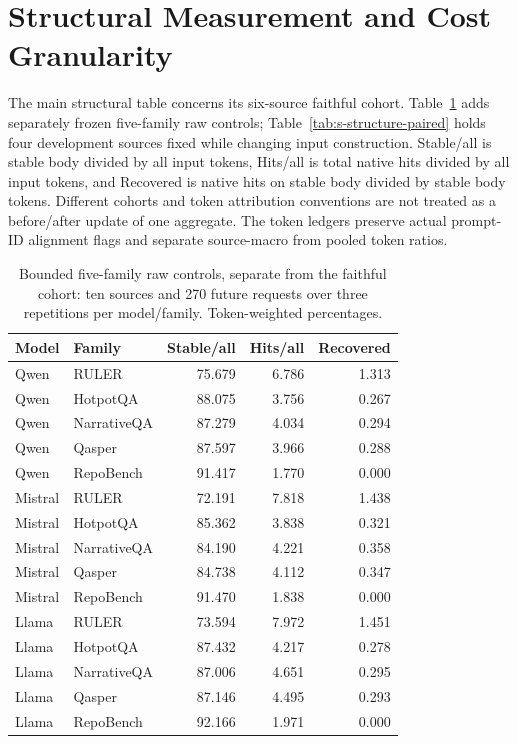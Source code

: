 \section{Structural Measurement and Cost Granularity}
\label{sec:s-closure}
The main structural table concerns its six-source faithful cohort. Table~\ref{tab:s-five-family-structure} adds separately frozen five-family raw controls; Table~\ref{tab:s-structure-paired} holds four development sources fixed while changing input construction. Stable/all is stable body divided by all input tokens, Hits/all is total native hits divided by all input tokens, and Recovered is native hits on stable body divided by stable body tokens. Different cohorts and token attribution conventions are not treated as a before/after update of one aggregate. The token ledgers preserve actual prompt-ID alignment flags and separate source-macro from pooled token ratios.

\begin{table}[!htb]
\centering\small
\caption{Bounded five-family raw controls, separate from the faithful cohort: ten sources and 270 future requests over three repetitions per model/family. Token-weighted percentages.}
\label{tab:s-five-family-structure}
\begin{tabular}{@{}llrrr@{}}
\toprule
Model & Family & Stable/all & Hits/all & Recovered\\
\midrule
Qwen & RULER & 75.679 & 6.786 & 1.313\\
Qwen & HotpotQA & 88.075 & 3.756 & 0.267\\
Qwen & NarrativeQA & 87.279 & 4.034 & 0.294\\
Qwen & Qasper & 87.597 & 3.966 & 0.288\\
Qwen & RepoBench & 91.417 & 1.770 & 0.000\\
Mistral & RULER & 72.191 & 7.818 & 1.438\\
Mistral & HotpotQA & 85.362 & 3.838 & 0.321\\
Mistral & NarrativeQA & 84.190 & 4.221 & 0.358\\
Mistral & Qasper & 84.738 & 4.112 & 0.347\\
Mistral & RepoBench & 91.470 & 1.838 & 0.000\\
Llama & RULER & 73.594 & 7.972 & 1.451\\
Llama & HotpotQA & 87.432 & 4.217 & 0.278\\
Llama & NarrativeQA & 87.006 & 4.651 & 0.295\\
Llama & Qasper & 87.146 & 4.495 & 0.293\\
Llama & RepoBench & 92.166 & 1.971 & 0.000\\
\bottomrule
\end{tabular}
\end{table}

